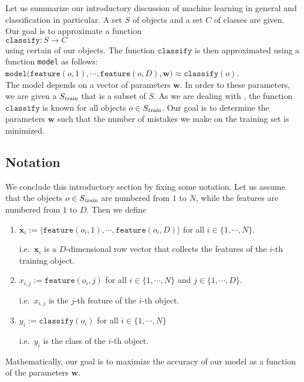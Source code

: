Let us summarize our introductory discussion of machine learning in general and classification in particular.
A set $S$ of objects and a set $C$ of classes are given.  Our goal is to approximate a function
\\[0.2cm]
\hspace*{1.3cm}
$\mathtt{classify}: S \rightarrow C$
\\[0.2cm]
using certain  of our objects.  The function $\mathtt{classify}$ is then approximated using a function
\texttt{model} as follows:
\\[0.2cm]
\hspace*{1.3cm}
$\mathtt{model}\bigl(\mathtt{feature}(o,1), \cdots, \mathtt{feature}(o,D), \mathbf{w}\bigr) \approx \mathtt{classify}(o)$.
\\[0.2cm]
The model depends on a vector of parameters $\mathbf{w}$.  In order to  these parameters, we are given a 
 $S_\textsl{train}$ that is a subset of $S$.  As we are dealing with , the function 
$\mathtt{classify}$ is known for all objects $o \in S_\textsl{train}$.   Our goal is to determine the parameters $\mathbf{w}$ such that the
number of mistakes we make on the training set is minimized.  

\subsection{Notation}
We conclude this introductory section by fixing some notation.  Let us assume that the objects $o \in S_\textsl{train}$
are numbered 
from $1$ to $N$, while the features are numbered from $1$ to $D$.  Then we define
\begin{enumerate}
\item $\textbf{x}_i := \langle\mathtt{feature}(o_i, 1), \cdots, \mathtt{feature}(o_i, D)\rangle$ \quad for all $i \in \{1, \cdots, N\}$.
  
      i.e.~$\mathbf{x}_i$ is a $D$-dimensional row vector that collects the features of the $i$-th training object.
\item $x_{i,j} := \mathtt{feature}(o_i, j)$ \quad for all $i \in \{1, \cdots, N\}$ and $j \in \{1, \cdots, D\}$.

      i.e.~$x_{i,j}$ is the $j$-th feature of the $i$-th object.
\item $y_i := \mathtt{classify}(o_i)$ \quad for all $i \in \{1, \cdots, N\}$

      i.e.~$y_i$ is the class of the $i$-th object.
\end{enumerate}
Mathematically, our goal is to maximize the accuracy of our model as a function of the parameters $\mathbf{w}$.

